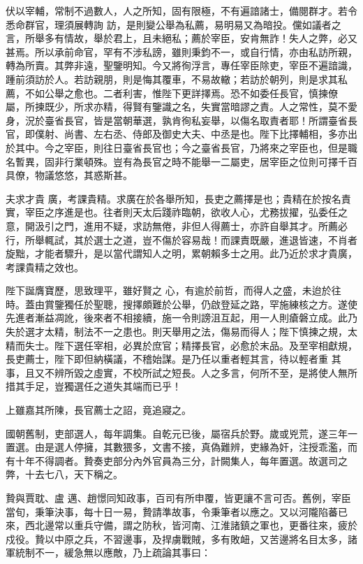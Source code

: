 \begin{pinyinscope}
 伏以宰輔，常制不過數人，人之所知，固有限極，不有遍諳諸士，備閱群才。若令悉命群官，理須展轉詢
 訪，是則變公舉為私薦，易明易又為暗投。儻如議者之言，所舉多有情故，舉於君上，且未絕私；薦於宰臣，安肯無詐！失人之弊，必又甚焉。所以承前命官，罕有不涉私謗，雖則秉鈞不一，或自行情，亦由私訪所親，轉為所賣。其弊非遠，聖鑒明知。今又將徇浮言，專任宰臣除吏，宰臣不遍諳識，踵前須訪於人。若訪親朋，則是悔其覆車，不易故轍；若訪於朝列，則是求其私薦，不如公舉之愈也。二者利害，惟陛下更詳擇焉。恐不如委任長官，慎揀僚
 屬，所揀既少，所求亦精，得賢有鑒識之名，失實當暗謬之責。人之常性，莫不愛身，況於臺省長官，皆是當朝華選，孰肯徇私妄舉，以傷名取責者耶！所謂臺省長官，即僕射、尚書、左右丞、侍郎及御史大夫、中丞是也。陛下比擇輔相，多亦出於其中。今之宰臣，則往日臺省長官也；今之臺省長官，乃將來之宰臣也，但是職名暫異，固非行業頓殊。豈有為長官之時不能舉一二屬吏，居宰臣之位則可擇千百具僚，物議悠悠，其惑斯甚。



 夫求才貴
 廣，考課貴精。求廣在於各舉所知，長吏之薦擇是也；貴精在於按名責實，宰臣之序進是也。往者則天太后踐祚臨朝，欲收人心，尤務拔擢，弘委任之意，開汲引之門，進用不疑，求訪無倦，非但人得薦士，亦許自舉其才。所薦必行，所舉輒試，其於選士之道，豈不傷於容易哉！而課責既嚴，進退皆速，不肖者旋黜，才能者驟升，是以當代謂知人之明，累朝賴多士之用。此乃近於求才貴廣，考課貴精之效也。



 陛下誕膺寶歷，思致理平，雖好賢之
 心，有逾於前哲，而得人之盛，未迨於往時。蓋由賞鑒獨任於聖聰，搜擇頗難於公舉，仍啟登延之路，罕施練核之方。遂使先進者漸益凋訛，後來者不相接續，施一令則謗沮互起，用一人則瘡磐立成。此乃失於選才太精，制法不一之患也。則天舉用之法，傷易而得人；陛下慎揀之規，太精而失士。陛下選任宰相，必異於庶官；精擇長官，必愈於末品。及至宰相獻規，長吏薦士，陛下即但納橫議，不稽始謀。是乃任以重者輕其言，待以輕者重
 其事，且又不辨所毀之虛實，不校所試之短長。人之多言，何所不至，是將使人無所措其手足，豈獨選任之道失其端而已乎！



 上雖嘉其所陳，長官薦士之詔，竟追寢之。



 國朝舊制，吏部選人，每年調集。自乾元已後，屬宿兵於野。歲或兇荒，遂三年一置選。由是選人停擁，其數猥多，文書不接，真偽難辨，吏緣為奸，注授乖濫，而有十年不得調者。贄奏吏部分內外官員為三分，計闕集人，每年置選。故選司之弊，十去七八，天下稱之。



 贄與賈耽、盧
 邁、趙憬同知政事，百司有所申覆，皆更讓不言可否。舊例，宰臣當旬，秉筆決事，每十日一易，贄請準故事，令秉筆者以應之。又以河隴陷蕃已來，西北邊常以重兵守備，謂之防秋，皆河南、江淮諸鎮之軍也，更番往來，疲於戍役。贄以中原之兵，不習邊事，及捍虜戰賊，多有敗衄，又苦邊將名目太多，諸軍統制不一，緩急無以應敵，乃上疏論其事曰：




\end{pinyinscope}
